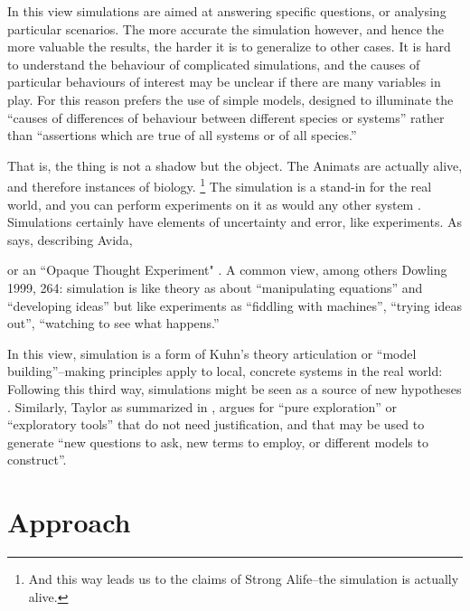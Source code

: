 In this view simulations are aimed at answering specific questions, or analysing particular scenarios. The more accurate the simulation however, and hence the more valuable the results, the harder it is to generalize to other cases. It is hard to understand the behaviour of complicated simulations, and the causes of particular behaviours of interest may be unclear if there are many variables in play. For this reason \parencite{MaynardSmith1974} prefers the use of simple models, designed to illuminate the ``causes of differences of behaviour between different species or systems'' rather than ``assertions which are true of all systems or of all species.''


That is, the thing is not a shadow but the object. The Animats are actually alive, and therefore instances of biology.
\footnote{And this way leads us to the claims of Strong Alife--the simulation is actually alive.}
The simulation is a stand-in for the real world, and you can perform experiments on it as would any other system \parencite[31]{Winsberg2010}. Simulations certainly have elements of uncertainty and error, like experiments. As \parencite{Adami2002} says, describing Avida, 


\parencite[31]{Winsberg2010} or an ``Opaque Thought Experiment" \parencite{DiPaolo2000}. A common view, among others Dowling 1999, 264: simulation is like theory as about ``manipulating equations'' and ``developing ideas'' but like experiments as ``fiddling with machines'', ``trying ideas out'', ``watching to see what happens.'' 

In this view, simulation is a form of Kuhn's theory articulation or ``model building''--making principles apply to local, concrete systems in the real world:  Following this third way, simulations might be seen as a source of new hypotheses \parencite{Eldridge}. Similarly, Taylor as summarized in \parencite{Webb2009}, argues for ``pure exploration'' or ``exploratory tools'' that do not need justification, and that may be used to generate ``new questions to ask, new terms to employ, or different models to construct''.

\section{Approach}
\begin{NOTES}
\end{NOTES}
